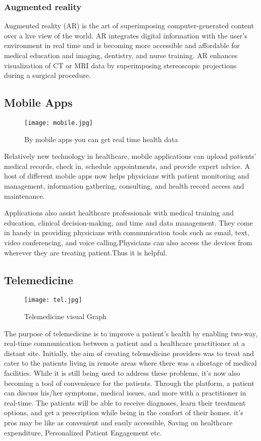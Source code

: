 \documentclass[12pts]{article}
\begin{document}
\subsubsection*{Augmented reality}
Augmented reality (AR) is the art of superimposing computer-generated content over a live view of the world. AR integrates digital information with the user’s environment in real time and is becoming more accessible and affordable for medical education and imaging, dentistry, and nurse training.
AR enhances visualization of CT or MRI data by superimposing stereoscopic projections during a surgical procedure.

\subsection*{Mobile Apps}


\begin{figure}[h]
\centering
\texttt{[image: mobile.jpg]}
\caption{By mobile apps you can get real time health data}
\end{figure}

Relatively new technology in healthcare, mobile applications can upload patients’ medical records, check in, schedule appointments, and provide expert advice. A host of different mobile apps now helps physicians with patient monitoring and management, information gathering, consulting, and health record access and maintenance. 

Applications also assist healthcare professionals with medical training and education, clinical decision-making, and time and data management. They come in handy in providing physicians with communication tools such as email, text, video conferencing, and voice calling.Physicians can also access the devices from wherever they are treating patient.Thus it is helpful.


\subsection*{Telemedicine}

\begin{figure}[h]
\centering
\texttt{[image: tel.jpg]}
\caption{Telemedicine visual Graph}
\end{figure}

The purpose of telemedicine is to improve a patient’s health by enabling two-way, real-time communication between a patient and a healthcare practitioner at a distant site. Initially, the aim of creating telemedicine providers was to treat and cater to the patients living in remote areas where there was a shortage of medical facilities. While it is still being used to address these problems, it’s now also becoming a tool of convenience for the patients.
Through the platform, a patient can discuss his/her symptoms, medical issues, and more with a practitioner in real-time. The patients will be able to receive diagnoses, learn their treatment options, and get a prescription while being in the comfort of their homes.
it's pros may be like as convenient and easily accessible, Saving on healthcare expenditure, Personalized Patient Engagement etc.
\end{document}
